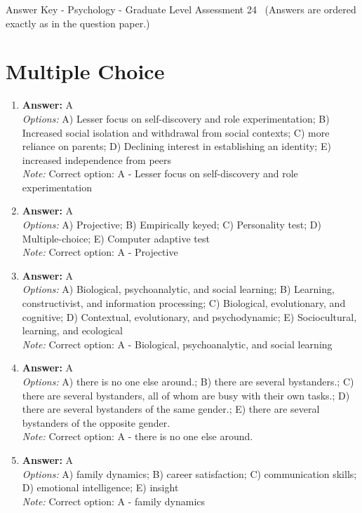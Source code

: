 \documentclass[12pt]{article}
\begin{document}
\begin{center}
Answer Key - Psychology - Graduate Level Assessment 24 \
\small (Answers are ordered exactly as in the question paper.)
\end{center}

\section*{Multiple Choice}
\begin{enumerate}[label=\arabic*.]
\item \textbf{Answer:} A
\\ \textit{Options:} A) Lesser focus on self-discovery and role experimentation; B) Increased social isolation and withdrawal from social contexts; C) more reliance on parents; D) Declining interest in establishing an identity; E) increased independence from peers
\\ \textit{Note:} Correct option: A - Lesser focus on self-discovery and role experimentation
\item \textbf{Answer:} A
\\ \textit{Options:} A) Projective; B) Empirically keyed; C) Personality test; D) Multiple-choice; E) Computer adaptive test
\\ \textit{Note:} Correct option: A - Projective
\item \textbf{Answer:} A
\\ \textit{Options:} A) Biological, psychoanalytic, and social learning; B) Learning, constructivist, and information processing; C) Biological, evolutionary, and cognitive; D) Contextual, evolutionary, and psychodynamic; E) Sociocultural, learning, and ecological
\\ \textit{Note:} Correct option: A - Biological, psychoanalytic, and social learning
\item \textbf{Answer:} A
\\ \textit{Options:} A) there is no one else around.; B) there are several bystanders.; C) there are several bystanders, all of whom are busy with their own tasks.; D) there are several bystanders of the same gender.; E) there are several bystanders of the opposite gender.
\\ \textit{Note:} Correct option: A - there is no one else around.
\item \textbf{Answer:} A
\\ \textit{Options:} A) family dynamics; B) career satisfaction; C) communication skills; D) emotional intelligence; E) insight
\\ \textit{Note:} Correct option: A - family dynamics
\end{enumerate}
\end{document}
